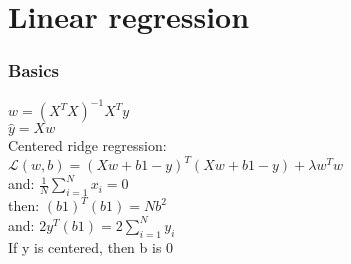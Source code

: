 \section{Linear regression}
\subsubsection{Basics}
$w = (X^{T}X)^{-1}X^{T}y$\\ $\hat{y}=Xw$\\ Centered ridge regression:\\
$\mathcal{L}(w,b)=(Xw + b1 - y)^{T}(Xw +b1 - y) + \lambda w^{T}w$\\ and:
$\frac{1}{N}\sum_{i=1}^{N}x_{i}= 0$\\ then: $(b1)^{T}(b1) = Nb^{2}$\\ and:
$2y^{T}(b1)=2\sum_{i=1}^{N}y_{i}$\\ If y is centered, then b is 0\\